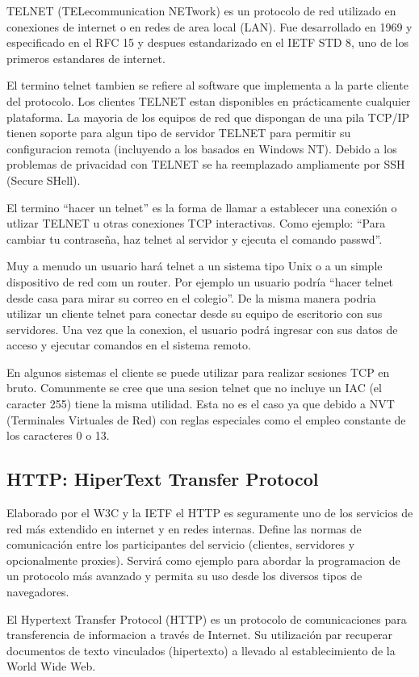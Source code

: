\documentclass[a4paper,spanish,12pt]{book}
\begin{document}
TELNET (TELecommunication NETwork) es un protocolo de red utilizado en conexiones de internet o en redes de area local (LAN). Fue desarrollado en 1969 y especificado en el RFC 15 y despues estandarizado en el IETF STD 8, uno de los primeros estandares de internet.

El termino telnet tambien se refiere al software que implementa a la parte cliente del protocolo. Los clientes TELNET estan disponibles en prácticamente cualquier plataforma. La mayoria de los equipos de red que dispongan de una pila TCP/IP tienen soporte  para algun tipo de servidor TELNET para permitir su configuracion remota (incluyendo a los basados en Windows NT). Debido a los problemas de privacidad con TELNET se ha reemplazado ampliamente por SSH (Secure SHell).

El termino ``hacer un telnet'' es la forma de llamar a establecer una conexión o utlizar TELNET u otras conexiones TCP interactivas. Como ejemplo: ``Para cambiar tu contraseña, haz telnet al servidor y ejecuta el comando passwd''.

Muy a menudo un usuario hará telnet a un sistema tipo Unix o a un simple dispositivo de red com un router. Por ejemplo un usuario podría ``hacer telnet desde casa para mirar su correo en el colegio''. De la misma manera podria utilizar un cliente telnet para conectar desde su equipo de escritorio con sus servidores. Una vez que la conexion, el usuario podrá ingresar con sus datos de acceso y ejecutar comandos en el sistema remoto.

En algunos sistemas el cliente se puede utilizar para realizar sesiones TCP en bruto. Comunmente se cree que una sesion telnet que no incluye un IAC (el caracter 255) tiene la misma utilidad. Esta no es el caso ya que debido a NVT (Terminales Virtuales de Red) con reglas especiales como el empleo constante de los caracteres 0 o 13.

\subsection{HTTP: HiperText Transfer Protocol}
Elaborado por el W3C y la IETF el HTTP es seguramente uno de los servicios de red más extendido en internet y en redes internas. Define las normas de comunicación entre los participantes del servicio (clientes, servidores y opcionalmente proxies). Servirá como ejemplo para abordar la programacion de un protocolo m\'as avanzado y permita su uso desde los diversos tipos de navegadores.

El Hypertext Transfer Protocol (HTTP) es un protocolo de comunicaciones para transferencia de informacion a trav\'es de Internet. Su utilización par recuperar documentos de texto vinculados (hipertexto) a llevado al establecimiento de la World Wide Web.
\end{document}
